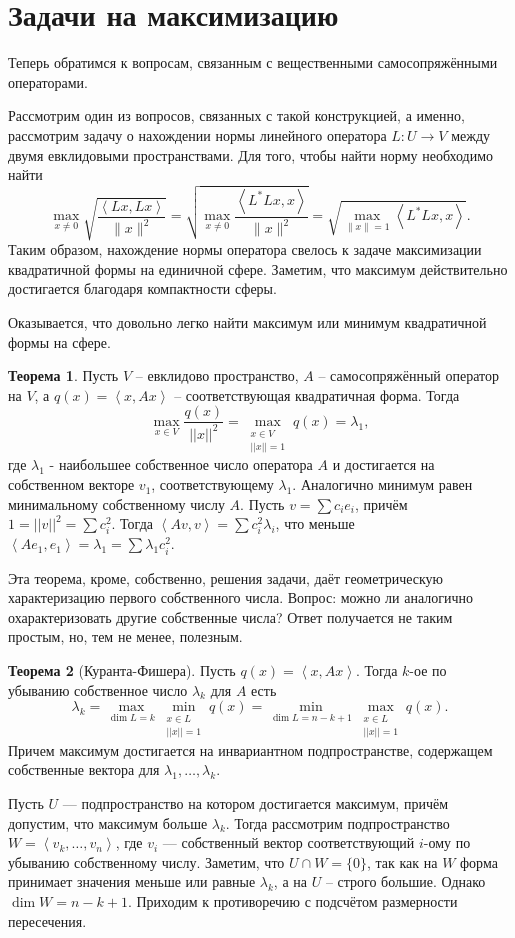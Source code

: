 \documentclass[10pt,a4paper,oneside]{book}
\theoremstyle{definition}
\newtheorem{thm}{\color{red!40!black}Теорема}
\def\lan{\left\langle }
\def\ran{\right\rangle}
\def\thrm{\begin{thm}}
\def\ethrm{\end{thm}}
\begin{document}
\section{Задачи на максимизацию}

Теперь обратимся к вопросам, связанным с вещественными самосопряжёнными операторами.

Рассмотрим один из вопросов, связанных с такой конструкцией, а именно, рассмотрим задачу о нахождении нормы линейного оператора $L \colon U \to V$ между двумя евклидовыми пространствами. Для того, чтобы найти  норму необходимо найти $$\max_{x\neq 0}\sqrt{\frac{\lan Lx,Lx\ran}{\|x\|^2}}=\sqrt{\max_{x\neq 0}\frac{\lan L^*Lx,x\ran}{\|x\|^2}}=\sqrt{\max_{\|x\|=1} \lan L^*Lx,x\ran}.$$
Таким образом, нахождение нормы оператора свелось к задаче максимизации квадратичной формы на единичной сфере. Заметим, что максимум действительно достигается благодаря компактности сферы.

Оказывается, что довольно легко найти максимум или минимум квадратичной формы на сфере.



\thrm Пусть $V$ -- евклидово пространство, $A$ -- самосопряжённый оператор на $V$, а $q(x)=\lan x,Ax\ran$ -- соответствующая квадратичная форма. Тогда 
$$\max_{ x\in V } \frac{q(x)}{||x||^2}=\max_{\substack{ x\in V \\ ||x||=1}} q(x)=\lambda_1,$$
 где $\lambda_1$ - наибольшее собственное число оператора $A$ и достигается на собственном векторе $v_1$, соответствующему $\lambda_1$. Аналогично минимум равен минимальному собственному числу $A$. 
\proof
Пусть $v=\sum c_i e_i$, причём $1=||v||^2=\sum c_i^2$. Тогда $\lan Av,v\ran = \sum c^2_i \lambda_i $, что меньше $\lan A e_1,e_1\ran= \lambda_1= \sum \lambda_1 c_i^2$.
\endproof
\ethrm

Эта теорема, кроме, собственно, решения задачи, даёт геометрическую характеризацию первого собственного числа. Вопрос: можно ли аналогично охарактеризовать другие собственные числа? Ответ получается не таким простым, но, тем не менее, полезным.

\thrm[Куранта-Фишера] Пусть $q(x)=\lan x, Ax\ran$. Тогда $k$-ое по убыванию собственное число $\lambda_k$ для $A$ есть 
$$ \lambda_k=\max_{\dim L=k} \min_{\substack{ x\in L \\ ||x||=1}} q(x) = \min_{\dim L=n-k+1} \max_{\substack{ x\in L \\ ||x||=1}} q(x).$$
Причем максимум достигается на инвариантном подпространстве, содержащем собственные вектора для $\lambda_1,\dots,\lambda_k$.
\ethrm
\proof Пусть $U$ --- подпространство на котором достигается максимум, причём допустим, что максимум больше $\lambda_k$. Тогда рассмотрим подпространство $W=\lan v_k,\dots,v_n\ran$, где $v_i$ --- собственный вектор соответствующий $i$-ому по убыванию собственному числу. Заметим, что $U\cap W=\{0\}$, так как на $W$ форма принимает значения меньше или равные $\lambda_k$, а на $U$ -- строго большие. Однако $\dim W=n-k+1$. Приходим к противоречию с подсчётом размерности пересечения. 
\endproof
\end{document}
